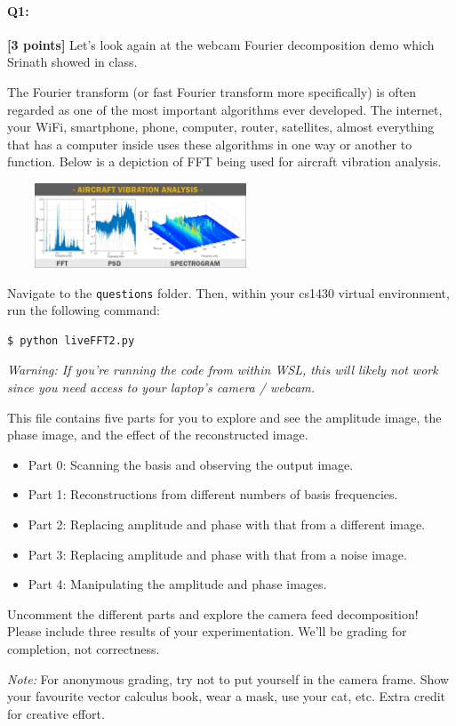 \documentclass[11pt]{article}
\begin{document}
\paragraph{Q1:} \textbf{[3 points]} Let's look again at the webcam Fourier decomposition demo which Srinath showed in class. 

The Fourier transform (or fast Fourier transform more specifically) is often regarded as one of the most important algorithms ever developed. The internet, your WiFi, smartphone, phone, computer, router, satellites, almost everything that has a computer inside uses these algorithms in one way or another to function. Below is a depiction of FFT being used for aircraft vibration analysis.

\begin{center}
\includegraphics[width=300px,height=95px]{images/aircraft-vibration-analysis-plots.png} 
\end{center}

\begin{tcolorbox}[colback=orange!5!white,colframe=orange!75!black]
Navigate to the \texttt{questions} folder. Then, within your cs1430 virtual environment, run the following command:
\begin{verbatim}
$ python liveFFT2.py
\end{verbatim}

\textit{Warning: If you're running the code from within WSL, this will likely not work since you need access to your laptop's camera / webcam.}

This file contains five parts for you to explore and see the amplitude image, the phase image, and the effect of the reconstructed image.
\begin{itemize}
    \item Part 0: Scanning the basis and observing the output image.
    \item Part 1: Reconstructions from different numbers of basis frequencies.
    \item Part 2: Replacing amplitude and phase with that from a different image.
    \item Part 3: Replacing amplitude and phase with that from a noise image.
    \item Part 4: Manipulating the amplitude and phase images.
\end{itemize}

Uncomment the different parts and explore the camera feed decomposition! Please include three results of your experimentation. We'll be grading for completion, not correctness.

\emph{Note:} For anonymous grading, try not to put yourself in the camera frame. Show your favourite vector calculus book, wear a mask, use your cat, etc. Extra credit for creative effort.
\end{tcolorbox}
\end{document}
